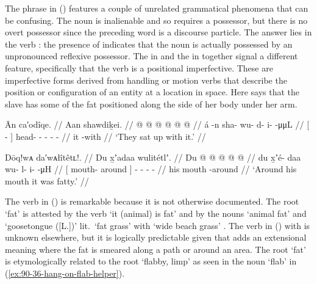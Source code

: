 The phrase  in (\lastx) features a couple of unrelated grammatical phenomena that can be confusing.
The noun  is inalienable and so requires a possessor, but there is no overt possessor since the preceding word  is a discourse particle.
The answer lies in the verb : the presence of  indicates that the noun is actually possessed by an unpronounced reflexive possessor.
The  in  and the  in  together signal a different feature, specifically that the verb is a positional imperfective.
These are imperfective forms derived from handling or motion verbs that describe the position or configuration of an entity at a location in space.
Here  says that the slave has some of the fat positioned along the side of her body under her arm.

\ex\label{ex:90-76-sit-up-with-it}%
%
\begingl
	\glpreamble	Ān ca′odîqe. //
	\glpreamble	Aan shawdiḵei. //
	\gla	{}  @ {} {}
		 @ {} @ {} @ {} @ {} @ {} //
	\glb	{} á -n {}
		sha- wu- d- i-  -μμL //
	\glc	{}[  - {}]
		head- - - -  - //
	\gld	{} it -with {}
		 {} {} {} {} {} //
	\glft	‘They sat up with it.’
		//
\endgl
\xe

\ex\label{ex:90-77-around-mouth-fat}%
%
\begingl
	\glpreamble	Dōq!wᴀ da′wᴀłîtêtʟ!. //
	\glpreamble	Du x̱ʼadaa wulitétlʼ. //
	\gla	{} Du  @ {} {}
		 @ {} @ {} @ {} @ {} //
	\glb	{} du x̱ʼé- daa {}
		wu- l- i-  -μH //
	\glc	{}[  mouth- around {}]
		- - -  - //
	\gld	{} his mouth -around {}
		 {} {} {} {} //
	\glft	‘Around his mouth it was fatty.’
		//
\endgl
\xe

The verb in (\lastx) is remarkable because it is not otherwise documented.
The root  ‘fat’ is attested by the verb  ‘it (animal) is fat’ \parencite[378]{leer:1976} and by the nouns  ‘animal fat’ and  ‘goosetongue ([L.])’ lit.\ ‘fat grass’ with  ‘wide beach grass’ \parencite[06/131]{leer:1973}.
The verb in (\lastx) with  is unknown elsewhere, but it is logically predictable given that  adds an extensional meaning where the fat is smeared along a path or around an area.
The root  ‘fat’ is etymologically related to the root  ‘flabby, limp’ as seen in the noun  ‘flab’ in (\ref{ex:90-36-hang-on-flab-helper}).

